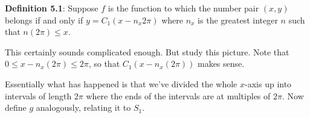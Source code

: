 \documentclass[english]{book}
\begin{document}
\vfill

\textbf{Definition 5.1}: Suppose $f$ is the function to which the number pair $(x,y)$ belongs if and only if $y=C_{1}(x-n_{x}2\pi)$ where $n_{x}$ is the greatest integer $n$ such that $n(2\pi) \leq x$.

\vspace{0.3cm}

\vfill

This certainly sounds complicated enough. But study this picture. Note that $0 \leq x - n_{x}(2\pi) \leq 2\pi$, so that $C_{1}(x-n_{x}(2\pi))$ makes sense.

\vfill

Essentially what has happened is that we've divided the whole $x$-axis up into intervals of length $2\pi$ where the ends of the intervals are at multiples of $2\pi$. Now define $g$ analogously, relating it to $S_{1}$.
\end{document}
